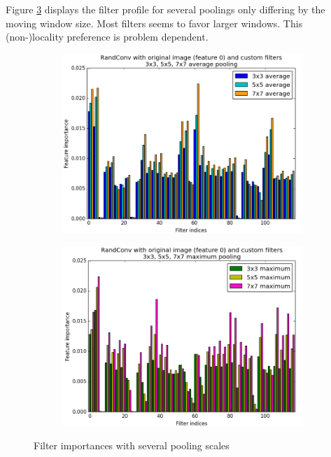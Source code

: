 \documentclass[a4paper]{report}
\newlength{\larg}
\begin{document}
	\par
	Figure \ref{fig:FIPoolScale} displays the filter profile for several poolings only differing by the moving window size. Most filters seems to favor larger windows. This (non-)locality preference is problem dependent.
	
	
	\begin{figure}
		\begin{subfigure}{.5\textwidth}
			\centering
			\includegraphics[width=1.\linewidth]{images/FIPoolAvg357.png}
			\caption{\label{fig:FIPoolAvg357}}
		\end{subfigure}%
		\begin{subfigure}{.5\textwidth}
			\centering
			\includegraphics[width=1.\linewidth]{images/FIPoolMax357.png}
			\caption{\label{fig:FIPoolMax357}}
		\end{subfigure}
		\caption{\label{fig:FIPoolScale}Filter importances with several pooling scales}
	\end{figure}
		
\end{document}
